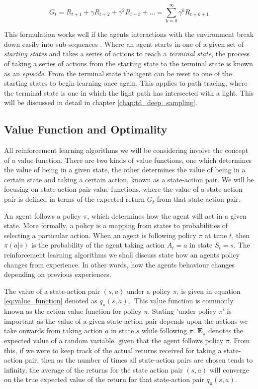 \documentclass[../dissertation.tex]{subfiles}
\begin{document}
\begin{equation}
\label{eq:return}
G_t = R_{t+1} + \gamma R_{t+2} + \gamma^2 R_{t+3} + ... = \sum^\infty_{k=0} \gamma^k R_{t+k+1}
\end{equation}

This formulation works well if the agents interactions with the environment break down easily into sub-sequences \cite{sutton2011reinforcement}. Where an agent starts in one of a given set of \textit{starting states} and takes a series of actions to reach a \textit{terminal state}, the process of taking a series of actions from the starting state to the terminal state is known as an \textit{episode}. From the terminal state the agent can be reset to one of the starting states to begin learning once again. This applies to path tracing, where the terminal state is one in which the light path has intersected with a light. This will be discussed in detail in chapter \ref{chap:td_deep_sampling}.

\subsection{Value Function and Optimality}
\label{sec:optimal_value}
All reinforcement learning algorithms we will be considering involve the concept of a value function. There are two kinds of value functions, one which determines the value of being in a given state, the other determines the value of being in a certain state and taking a certain action, known as a state-action pair. We will be focusing on state-action pair value functions, where the value of a state-action pair is defined in terms of the expected return $G_t$ from that state-action pair.

An agent follows a policy $\pi$, which determines how the agent will act in a given state. More formally, a policy is a mapping from states to probabilities of selecting a particular action. When an agent is following policy $\pi$ at time $t$, then $\pi(a|s)$ is the probability of the agent taking action $A_t = a$ in state  $S_t = s$. The reinforcement learning algorithms we shall discuss state how an agents policy changes from experience. In other words, how the agents behaviour changes depending on previous experiences.

The value of a state-action pair $(s,a)$ under a policy $\pi$, is given in equation \ref{eq:value_function} denoted as $q_\pi(s,a)$,. This value function is commonly known as the action value function for policy $\pi$. Stating 'under policy $\pi$' is important as the value of a given state-action pair depends upon the actions we take onwards from taking action $a$ in state $s$ while following $\pi$. $\mathbf{E}_\pi$ denotes the expected value of a random variable, given that the agent follows policy $\pi$. From this, if we were to keep track of the actual returns received for taking a state-action pair, then as the number of times all state-action pairs are chosen tends to infinity, the average of the returns for the state action pair $(s,a)$ will converge on the true expected value of the return for that state-action pair $q_\pi(s,a)$.
\end{document}
